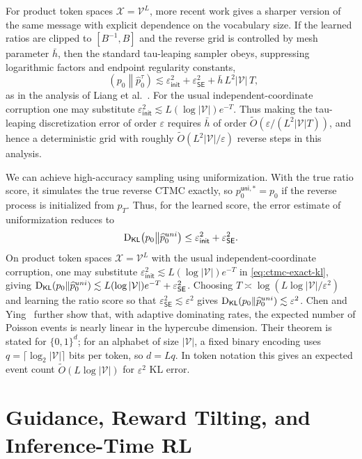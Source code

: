 \documentclass[10pt,a4paper]{amsart}
\numberwithin{equation}{section}
\DeclareMathOperator{\KL}{D_{\mathsf{KL}}}
\newcommand{\cX}{\mathcal{X}}
\newcommand{\mc}[1]{\mathcal{#1}}
\newcommand{\wh}[1]{\widehat{#1}}
\newcommand{\eps}{\varepsilon}
\newcommand{\epsinit}{\varepsilon_{\mathsf{init}}}
\newcommand{\epsSE}{\varepsilon_{\mathsf{SE}}}
\newcommand{\tO}{\widetilde O}
\begin{document}
For product token spaces $\cX=\mc{V}^L$, more recent work gives a sharper
version of the same message with explicit dependence on the vocabulary size.
If the learned ratios are clipped to $[B^{-1},B]$ and the reverse grid is
controlled by mesh parameter $\bar h$, then the standard tau-leaping sampler
obeys, suppressing logarithmic factors and endpoint regularity constants,
\begin{equation}\label{eq:tau-leaping-kl-product}
    \KL\!\left(p_0\middle\|\wh p_0^\tau\right)
    \lesssim
    \epsinit^2
    +\epsSE^2
    +\bar h\, L^2|\mc{V}|\,T,
\end{equation}
as in the analysis of Liang et al.~\cite{liang2025sampler}.  For the usual
independent-coordinate corruption one may substitute
$\epsinit^2\lesssim L(\log|\mc{V}|)e^{-T}$.  Thus making the tau-leaping
discretization error of order $\eps$ requires
$\bar h$ of order $\tO(\eps/(L^2|\mc{V}|T))$, and hence a deterministic grid
with roughly $\tO(L^2|\mc{V}|/\eps)$ reverse steps in this analysis.

We can achieve high-accuracy sampling using uniformization.  With the true
ratio score, it simulates the true reverse CTMC exactly, so
$p_0^{\mathsf{uni},*}=p_0$ if the reverse process is initialized from
$p_T$.  Thus, for the learned score, the error estimate of uniformization reduces to
\begin{equation}\label{eq:ctmc-exact-kl}
    \KL\!\left(p_0\middle\|\wh p_0^{\rm uni}\right)
    \leq
    \epsinit^2
    +\epsSE^2.
\end{equation}
On product token spaces $\cX=\mc{V}^L$ with the usual independent-coordinate
corruption, one may substitute
$\epsinit^2\lesssim L(\log|\mc{V}|)e^{-T}$ in \eqref{eq:ctmc-exact-kl}, giving
$\KL(p_0\|\wh p_0^{\rm uni})\lesssim
L(\log|\mc{V}|)e^{-T}+\epsSE^2$.
Choosing $T\asymp\log(L\log|\mc{V}|/\eps^2)$ and learning the ratio score so
that $\epsSE^2\lesssim\eps^2$ gives
$\KL(p_0\|\wh p_0^{\rm uni})\lesssim\eps^2$.  Chen and
Ying~\cite{chenying2024discrete} further show that, with adaptive dominating
rates, the expected number of Poisson events is nearly linear in the hypercube
dimension.  Their theorem is stated for $\{0,1\}^d$; for an alphabet of size
$|\mc{V}|$, a fixed binary encoding uses
$q=\lceil\log_2|\mc{V}|\rceil$ bits per token, so $d=Lq$.  In token notation
this gives an expected event count
$\tO\!\left(L\log|\mc{V}|\right)$
for $\eps^2$ KL error.

\section{Guidance, Reward Tilting, and Inference-Time RL}
\label{sec:guidance}
\end{document}
